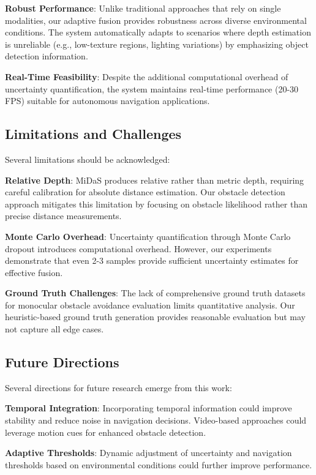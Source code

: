 \documentclass[12pt,oneside]{book}
\begin{document}
\textbf{Robust Performance}: Unlike traditional approaches that rely on single modalities, our adaptive fusion provides robustness across diverse environmental conditions. The system automatically adapts to scenarios where depth estimation is unreliable (e.g., low-texture regions, lighting variations) by emphasizing object detection information.

\textbf{Real-Time Feasibility}: Despite the additional computational overhead of uncertainty quantification, the system maintains real-time performance (20-30 FPS) suitable for autonomous navigation applications.

\subsection{Limitations and Challenges}

Several limitations should be acknowledged:

\textbf{Relative Depth}: MiDaS produces relative rather than metric depth, requiring careful calibration for absolute distance estimation. Our obstacle detection approach mitigates this limitation by focusing on obstacle likelihood rather than precise distance measurements.

\textbf{Monte Carlo Overhead}: Uncertainty quantification through Monte Carlo dropout introduces computational overhead. However, our experiments demonstrate that even 2-3 samples provide sufficient uncertainty estimates for effective fusion.

\textbf{Ground Truth Challenges}: The lack of comprehensive ground truth datasets for monocular obstacle avoidance evaluation limits quantitative analysis. Our heuristic-based ground truth generation provides reasonable evaluation but may not capture all edge cases.

\subsection{Future Directions}

Several directions for future research emerge from this work:

\textbf{Temporal Integration}: Incorporating temporal information could improve stability and reduce noise in navigation decisions. Video-based approaches could leverage motion cues for enhanced obstacle detection.

\textbf{Adaptive Thresholds}: Dynamic adjustment of uncertainty and navigation thresholds based on environmental conditions could further improve performance.
\end{document}
